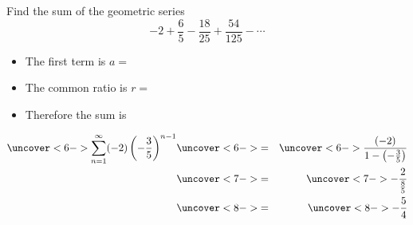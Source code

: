 \begin{frame}
\begin{example}
Find the sum of the geometric series
\[
-2 + \frac{6}{5} - \frac{18}{25} + \frac{54}{125} - \cdots
\]
\begin{itemize}
\item<2-| alert@2-3>  The first term is $a = $ 
\item<2-| alert@4-5>  The common ratio is $r = $ 
\item<6->  Therefore the sum is
\end{itemize}
\begin{eqnarray*}
\uncover<6->{%
\sum_{n=1}^\infty (-2)\left( - \frac{3}{5}\right)^{n-1}%
}%
& \uncover<6->{ = } &%
\uncover<6->{%
\frac{(-2)}{1-\left( - \frac{3}{5}\right)}%
}\\%
& \uncover<7->{ = } &%
\uncover<7->{%
-\frac{2}{\frac{8}{5}}%
}\\%
& \uncover<8->{ = } &%
\uncover<8->{%
-\frac{5}{4}%
}%
\end{eqnarray*}
\end{example}
\end{frame}
